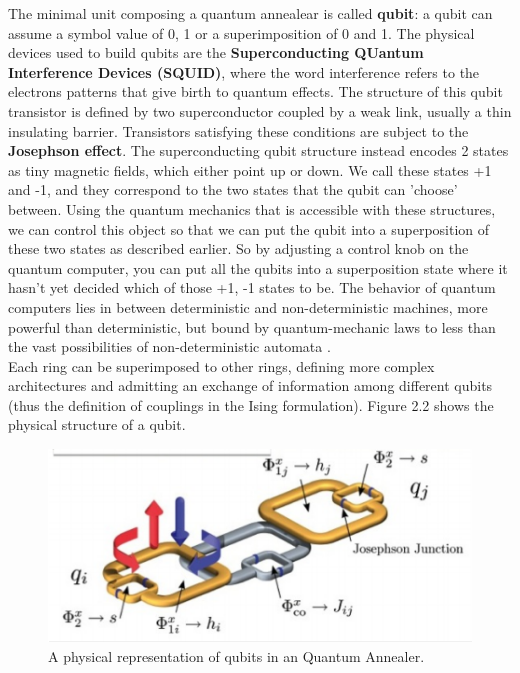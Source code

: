  The minimal unit composing a quantum annealear is called \textbf{qubit}: a qubit can assume a symbol value of 0, 1 or a superimposition of 0 and 1. The physical devices used to build qubits are the \textbf{Superconducting QUantum Interference Devices (SQUID)}, where the word interference refers to the electrons patterns that give birth to quantum effects. The structure of this qubit transistor is defined by two superconductor coupled by a weak link, usually a thin insulating barrier. Transistors satisfying these conditions are subject to the \textbf{Josephson effect}. The superconducting qubit structure instead encodes 2 states as tiny magnetic fields, which either point up or down. We call these states +1 and -1, and they correspond to the two states that the qubit can 'choose' between. Using the quantum mechanics that is accessible with these structures, we can control this object so that we can put the qubit into a superposition of these two states as described earlier. So by adjusting a control knob on the quantum computer, you can put all the qubits into a superposition state where it hasn't yet decided which of those +1, -1 states to be. The behavior of quantum computers lies in between deterministic
and non-deterministic machines, more powerful than deterministic, but bound by quantum-mechanic laws to less than the vast possibilities of non-deterministic automata \cite{pa11}.\\
  Each ring can be superimposed to other rings, defining more complex architectures and admitting an exchange of information among different qubits (thus the definition of couplings in the Ising formulation). Figure 2.2 shows the physical structure of a qubit.\\
  
  \begin{figure}[t]
	\begin{center}
	\includegraphics{images/QA.PNG}
	\caption{A physical representation of qubits in an Quantum Annealer.}
	\end{center}
\end{figure}

